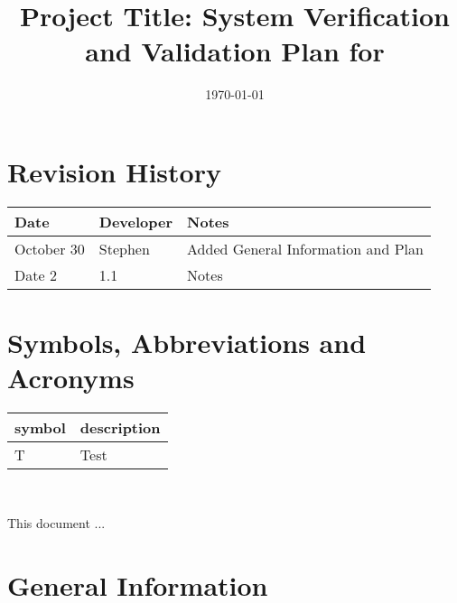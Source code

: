 \documentclass[12pt, titlepage]{article}
\begin{document}
\title{Project Title: System Verification and Validation Plan for \progname{}} 
\author{\authname}
\date{\today}
	
\maketitle


\section{Revision History}

\begin{tabularx}{\textwidth}{p{3cm}p{2cm}X}
\toprule {\bf Date} & {\bf Developer} & {\bf Notes}\\
\midrule
October 30 & Stephen & Added General Information and Plan\\
Date 2 & 1.1 & Notes\\
\bottomrule
\end{tabularx}

\newpage

\tableofcontents

\listoftables
{}

\listoffigures
{}

\newpage

\section{Symbols, Abbreviations and Acronyms}

\renewcommand{\arraystretch}{1.2}
\begin{tabular}{l l} 
  \toprule		
  \textbf{symbol} & \textbf{description}\\
  \midrule 
  T & Test\\
  \bottomrule
\end{tabular}\\


\newpage


This document ... 

\section{General Information}
\end{document}
